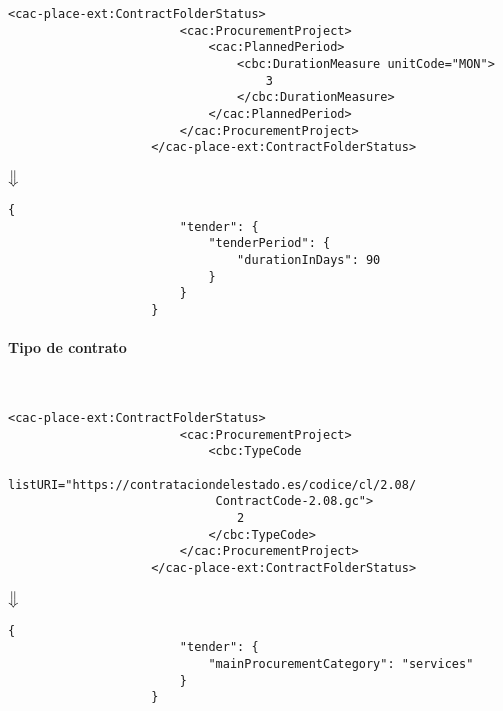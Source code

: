                 \begin{lstlisting}[language=lXML]
                    <cac-place-ext:ContractFolderStatus>
                        <cac:ProcurementProject>
                            <cac:PlannedPeriod>
                                <cbc:DurationMeasure unitCode="MON">
                                    3
                                </cbc:DurationMeasure>
                            </cac:PlannedPeriod>
                        </cac:ProcurementProject>
                    </cac-place-ext:ContractFolderStatus>
                \end{lstlisting}
                
                
                \begin{center}
                    $\big\Downarrow$
                \end{center}
                
                \begin{lstlisting}[language=lJSON]
                    {
                        "tender": {
                            "tenderPeriod": {
                                "durationInDays": 90
                            }
                        }
                    }
                \end{lstlisting}
            
            \paragraph{Tipo de contrato} \mbox{}\\
                \begin{lstlisting}[language=lXML]
                    <cac-place-ext:ContractFolderStatus>
                        <cac:ProcurementProject>
                            <cbc:TypeCode
                             listURI="https://contrataciondelestado.es/codice/cl/2.08/
                             ContractCode-2.08.gc">
                                2
                            </cbc:TypeCode>
                        </cac:ProcurementProject>
                    </cac-place-ext:ContractFolderStatus>
                \end{lstlisting}
                
                \begin{center}
                    $\big\Downarrow$
                \end{center}
                
                \begin{lstlisting}[language=lJSON]
                    {
                        "tender": {
                            "mainProcurementCategory": "services"
                        }
                    }
                \end{lstlisting}
                        
